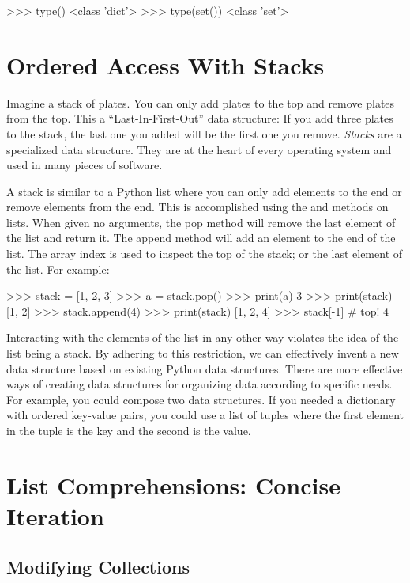 \documentclass[11pt]{cselabheader}
\begin{document}
\begin{pyconcode}
>>> type({})
<class 'dict'>
>>> type(set())
<class 'set'>

\end{pyconcode}


\section{Ordered Access With Stacks}
Imagine a stack of plates. You can only add plates to the top and
remove plates from the top. This a ``Last-In-First-Out'' data structure:
If you add three plates to the stack, the last one you added will be the first
one you remove.
\emph{Stacks} are a specialized data structure.
They are at the heart of every operating system and used in many
pieces of software.

A stack is similar to a Python list where you can only add elements to the end
or remove elements from the end. This is accomplished using the
 and  methods on
lists. When given no arguments, the pop method will remove the last element of
the list and return it. The append method will add an element to the end of the
list.  The array index  is used to inspect the top of the
stack; or the last element of the list. For example:

\begin{pyconcode}
>>> stack = [1, 2, 3]
>>> a = stack.pop()
>>> print(a)
3
>>> print(stack)
[1, 2]
>>> stack.append(4)
>>> print(stack)
[1, 2, 4]
>>> stack[-1]  # top!
4

\end{pyconcode}

Interacting with the elements of the list in any other way violates the idea of
the list being a stack.  By adhering to this restriction, we can effectively
invent a new data structure based on existing Python data structures.  There
are more effective ways of creating data structures for organizing data
according to specific needs.  For example, you could compose two data
structures.  If you needed a dictionary with ordered key-value pairs, you could
use a list of tuples where the first element in the tuple is the key and the
second is the value.


\section{List Comprehensions: Concise Iteration}
\subsection{Modifying Collections}
\end{document}

